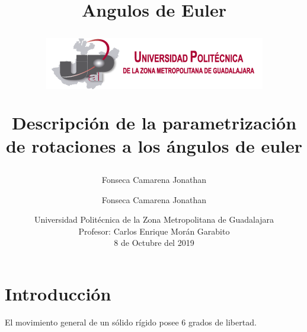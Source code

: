 \documentclass[12pt,a4paper]{report}
\author{Fonseca Camarena Jonathan}
\title{Angulos de Euler}
\begin{document}
\author{Fonseca Camarena Jonathan}

\title{\begin{center}
\includegraphics[scale=1.5]{Escudo.png} 
\end{center}Descripción de la parametrización de rotaciones a los ángulos de euler}

\date{
Universidad Politécnica de la Zona Metropolitana de Guadalajara\\
Profesor: Carlos Enrique Morán Garabito\\
8 de Octubre del 2019}


\maketitle
\tableofcontents

\section{Introducción}
El movimiento general de un sólido rígido posee 6 grados de libertad.
\end{document}
